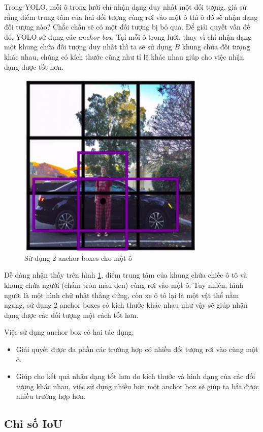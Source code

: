 \documentclass[../thesis.tex]{subfiles}
\begin{document}
Trong YOLO, mỗi ô trong lưới chỉ nhận dạng duy nhất một đối tượng, giả sử rằng điểm trung tâm của hai đối tượng cùng rơi vào một ô thì ô đó sẽ nhận dạng đối tượng nào? Chắc chắn sẽ có một đối tượng bị bỏ qua. Để giải quyết vấn đề đó, YOLO sử dụng các \textit{anchor box}. Tại mỗi ô trong lưới, thay vì chỉ nhận dạng một khung chứa đối tượng duy nhất thì ta sẽ sử dụng $B$ khung chứa đối tượng khác nhau, chúng có kích thước cũng như tỉ lệ khác nhau giúp cho việc nhận dạng được tốt hơn. 

\begin{figure}[H]
    \begin{center}
        \includegraphics[width=0.5\linewidth]{images/anchor_box.png}
    \end{center}
    \caption{Sử dụng 2 anchor boxes cho một ô \cite{cnn-ang}}
    \label{anchor_box}
\end{figure}

Dễ dàng nhận thấy trên hình \ref{anchor_box}, điểm trung tâm của khung chứa chiếc ô tô và khung chứa người (chấm tròn màu đen) cùng rơi vào một ô. Tuy nhiên, hình người là một hình chữ nhật thẳng đứng, còn xe ô tô lại là một vật thể nằm ngang, sử dụng 2 anchor boxes có kích thước khác nhau như vậy sẽ giúp nhận dạng được các đối tượng một cách tốt hơn. 

Việc sử dụng anchor box có hai tác dụng:

\begin{itemize}[topsep=0pt]
    \item Giải quyết được đa phần các trường hợp có nhiều đối tượng rơi vào cùng một ô.
    \item Giúp cho kết quả nhận dạng tốt hơn do kích thước và hình dạng của các đối tượng khác nhau, việc sử dụng nhiều hơn một anchor box sẽ giúp ta bắt được nhiều trường hợp hơn.
\end{itemize}

\subsection{Chỉ số IoU}
\end{document}
